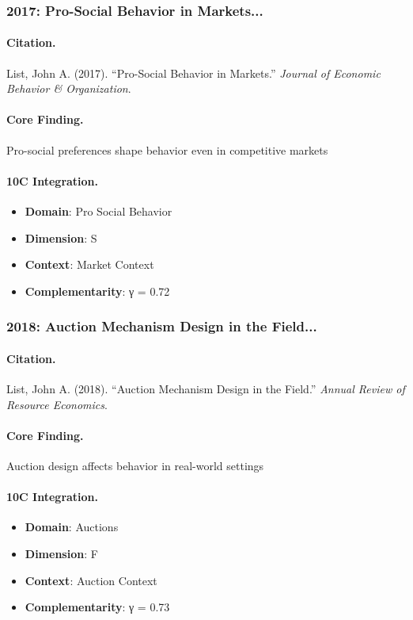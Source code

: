 \subsubsection{2017: Pro-Social Behavior in Markets...}

\paragraph{Citation.}
List, John A. (2017). ``Pro-Social Behavior in Markets.''
\textit{Journal of Economic Behavior & Organization}.

\paragraph{Core Finding.}
Pro-social preferences shape behavior even in competitive markets

\paragraph{10C Integration.}
\begin{itemize}[nosep]
  \item \textbf{Domain}: Pro Social Behavior
  \item \textbf{Dimension}: S
  \item \textbf{Context}: Market Context
  \item \textbf{Complementarity}: γ = 0.72
\end{itemize}


\subsubsection{2018: Auction Mechanism Design in the Field...}

\paragraph{Citation.}
List, John A. (2018). ``Auction Mechanism Design in the Field.''
\textit{Annual Review of Resource Economics}.

\paragraph{Core Finding.}
Auction design affects behavior in real-world settings

\paragraph{10C Integration.}
\begin{itemize}[nosep]
  \item \textbf{Domain}: Auctions
  \item \textbf{Dimension}: F
  \item \textbf{Context}: Auction Context
  \item \textbf{Complementarity}: γ = 0.73
\end{itemize}


